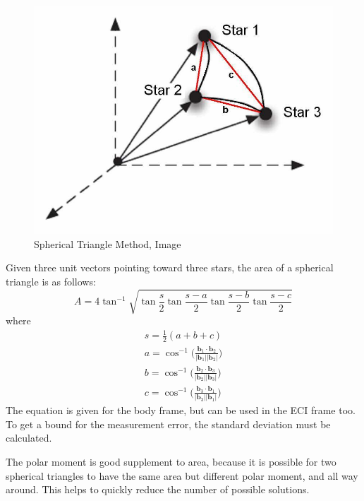 \documentclass[12pt,a4paper,oneside]{article}
\begin{document}
\begin{figure}[ht]
\includegraphics[scale=0.29]{spherical_triangle_method.jpg}
\centering
\caption{Spherical Triangle Method, Image \citet{cole2004fast}}
\label{fig:spherical_triangle_method}
\end{figure}
Given three unit vectors pointing toward three stars, the area of a spherical triangle is as follows:
\begin{equation}
A = 4\tan^{-1}\sqrt{\tan\frac{s}{2}\tan\frac{s-a}{2}\tan\frac{s-b}{2}\tan\frac{s-c}{2}}
\end{equation}
where
\begin{subequations}
\begin{align*}
s = \frac{1}{2}(a + b + c) \\
a = \cos^{-1} \bigg(\frac{\bm{b}_1 \cdot \bm{b}_2}{|\bm{b}_1||\bm{b}_2|}\bigg) \\
b = \cos^{-1} \bigg(\frac{\bm{b}_2 \cdot \bm{b}_3}{|\bm{b}_2||\bm{b}_3|}\bigg) \\
c = \cos^{-1} \bigg(\frac{\bm{b}_3 \cdot \bm{b}_1}{|\bm{b}_3||\bm{b}_1|}\bigg) 
\end{align*}
\end{subequations}
The equation is given for the body frame, but can be used in the ECI frame too. To get a bound for the measurement error, the standard deviation must be calculated.

The polar moment is good supplement to area, because it is possible for two spherical triangles to have the same area but different polar moment, and all way around. This helps to quickly reduce the number of possible solutions.
\end{document}
